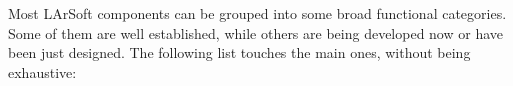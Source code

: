 Most LArSoft components can be grouped into some broad functional categories.
Some of them are well established, while others are being developed now or have been just designed.
The following list touches the main ones, without being exhaustive:
